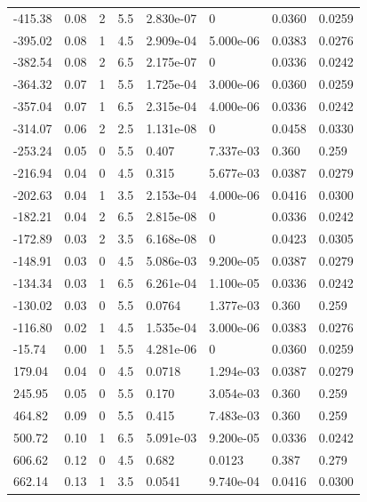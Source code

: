 \documentclass[preview]{standalone}
\begin{document}
{{\begin{tabular}{L{1.2cm}C{1.2cm} C{0.3cm}C{0.5cm} C{1.4cm}C{1.4cm} C{1.4cm}C{1.4cm}}
  -415.38  &  0.08  & 2     & 5.5 &  2.830e-07  & 0  & 0.0360 &  0.0259   \\ 
  -395.02  &  0.08  & 1     & 4.5 &  2.909e-04  & 5.000e-06  & 0.0383 &  0.0276   \\ 
  -382.54  &  0.08  & 2     & 6.5 &  2.175e-07  & 0  & 0.0336 &  0.0242   \\ 
  -364.32  &  0.07  & 1     & 5.5 &  1.725e-04  & 3.000e-06  & 0.0360 &  0.0259   \\ 
  -357.04  &  0.07  & 1     & 6.5 &  2.315e-04  & 4.000e-06  & 0.0336 &  0.0242   \\ 
  -314.07  &  0.06  & 2     & 2.5 &  1.131e-08  & 0  & 0.0458 &  0.0330   \\ 
  -253.24  &  0.05  & 0     & 5.5 &  0.407  & 7.337e-03  & 0.360 &  0.259   \\ 
  -216.94  &  0.04  & 0     & 4.5 &  0.315  & 5.677e-03  & 0.0387 &  0.0279   \\ 
  -202.63  &  0.04  & 1     & 3.5 &  2.153e-04  & 4.000e-06  & 0.0416 &  0.0300   \\ 
  -182.21  &  0.04  & 2     & 6.5 &  2.815e-08  & 0  & 0.0336 &  0.0242   \\ 
  -172.89  &  0.03  & 2     & 3.5 &  6.168e-08  & 0  & 0.0423 &  0.0305   \\ 
  -148.91  &  0.03  & 0     & 4.5 &  5.086e-03  & 9.200e-05  & 0.0387 &  0.0279   \\ 
  -134.34  &  0.03  & 1     & 6.5 &  6.261e-04  & 1.100e-05  & 0.0336 &  0.0242   \\ 
  -130.02  &  0.03  & 0     & 5.5 &  0.0764  & 1.377e-03  & 0.360 &  0.259   \\ 
  -116.80  &  0.02  & 1     & 4.5 &  1.535e-04  & 3.000e-06  & 0.0383 &  0.0276   \\ 
  -15.74  &  0.00  & 1     & 5.5 &  4.281e-06  & 0  & 0.0360 &  0.0259   \\ 
  179.04  &  0.04  & 0     & 4.5 &  0.0718  & 1.294e-03  & 0.0387 &  0.0279   \\ 
  245.95  &  0.05  & 0     & 5.5 &  0.170  & 3.054e-03  & 0.360 &  0.259   \\ 
  464.82  &  0.09  & 0     & 5.5 &  0.415  & 7.483e-03  & 0.360 &  0.259   \\ 
  500.72  &  0.10  & 1     & 6.5 &  5.091e-03  & 9.200e-05  & 0.0336 &  0.0242   \\ 
  606.62  &  0.12  & 0     & 4.5 &  0.682  & 0.0123  & 0.387 &  0.279   \\ 
  662.14  &  0.13  & 1     & 3.5 &  0.0541  & 9.740e-04  & 0.0416 &  0.0300   \\ 

\end{tabular}}}
\end{document}
